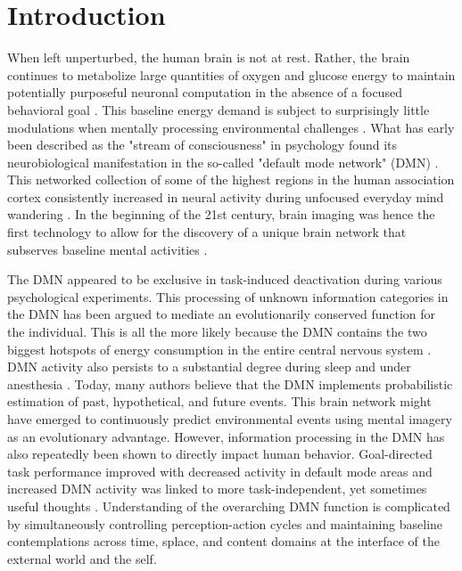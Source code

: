 \documentclass{article} %
\begin{document}
\section{Introduction}
%
When left unperturbed, the human brain is not at rest.
Rather, the brain continues to metabolize large quantities of
oxygen and glucose energy to maintain
potentially purposeful neuronal computation
in the absence of a focused behavioral goal
\citep{kenet2003spontaneously, fiser2004small}.
This baseline energy demand is subject to surprisingly little modulations
when mentally processing environmental challenges
\citep{raichle2001pnas}.
What has early been described as the "stream of consciousness"
in psychology \citep{james1890principles}
found its neurobiological manifestation
in the so-called "default mode network" (DMN)
\citep{shul1997}. This networked collection of some of the highest regions in
the human association cortex \citep{mesulam1998sensation, margulies2016situating}
consistently
increased in neural activity during
unfocused everyday mind wandering \citep{raichle2001pnas}.
In the beginning of the 21st century, brain imaging was hence the first technology
to allow for the discovery of a unique brain network that subserves
baseline mental activities
\citep{bzdok2015resting}.



The DMN appeared to be exclusive in task-induced
deactivation during various psychological experiments.
This processing of unknown information categories in the DMN has
been argued to mediate an evolutionarily conserved function for the individual.
This is all the more likely because the DMN contains the two
biggest hotspots of energy consumption in the entire central nervous system
\citep{raichle2001pnas}.
DMN activity also persists to a substantial degree during
sleep and under anesthesia \citep{randy2008}.
Today, many authors believe that the DMN implements
probabilistic estimation of past, hypothetical, and future events. This
brain network
might have emerged to continuously predict environmental events using
mental imagery as an evolutionary advantage.
%
However, information processing in the DMN has also repeatedly
been shown to directly impact human behavior. Goal-directed task performance
improved with decreased activity in default mode areas \citep{weiss2006}
and increased DMN activity was linked to more task-independent,
yet sometimes useful thoughts
\citep{mason2007, seli2016mind}.
%
Understanding of the overarching DMN function is complicated by
simultaneously controlling perception-action cycles and
maintaining baseline contemplations
across time, splace, and content domains
at the interface of the external world and the self.
\end{document}
